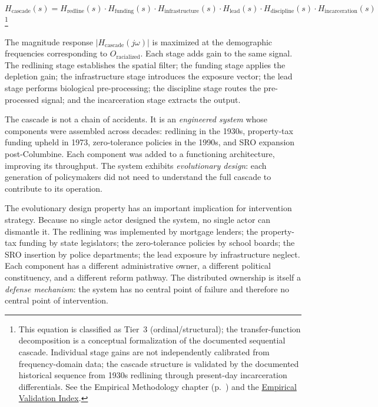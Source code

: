 \begin{equation}\label{eq:cascade-transfer}
H_{\text{cascade}}(s) = H_{\text{redline}}(s) \cdot H_{\text{funding}}(s) \cdot H_{\text{infrastructure}}(s) \cdot H_{\text{lead}}(s) \cdot H_{\text{discipline}}(s) \cdot H_{\text{incarceration}}(s)
\end{equation}
\footnote{This equation is classified as Tier~3 (ordinal/structural); the transfer-function decomposition is a conceptual formalization of the documented sequential cascade. Individual stage gains are not independently calibrated from frequency-domain data; the cascade structure is validated by the documented historical sequence from 1930s redlining through present-day incarceration differentials. See the Empirical Methodology chapter (p.~\pageref{ch:empirical_methodology}) and the \hyperref[app:empirical_index]{Empirical Validation Index}.}

The magnitude response $|H_{\text{cascade}}(j\omega)|$ is maximized at the demographic frequencies corresponding to $O_{\text{racialized}}$. Each stage adds gain to the same signal. The redlining stage establishes the spatial filter; the funding stage applies the depletion gain; the infrastructure stage introduces the exposure vector; the lead stage performs biological pre-processing; the discipline stage routes the pre-processed signal; and the incarceration stage extracts the output.

The cascade is not a chain of accidents. It is an \textit{engineered system} whose components were assembled across decades: redlining in the 1930s, property-tax funding upheld in 1973, zero-tolerance policies in the 1990s, and SRO expansion post-Columbine. Each component was added to a functioning architecture, improving its throughput. The system exhibits \textit{evolutionary design}: each generation of policymakers did not need to understand the full cascade to contribute to its operation.

The evolutionary design property has an important implication for intervention strategy. Because no single actor designed the system, no single actor can dismantle it. The redlining was implemented by mortgage lenders; the property-tax funding by state legislators; the zero-tolerance policies by school boards; the SRO insertion by police departments; the lead exposure by infrastructure neglect. Each component has a different administrative owner, a different political constituency, and a different reform pathway. The distributed ownership is itself a \textit{defense mechanism}: the system has no central point of failure and therefore no central point of intervention.

